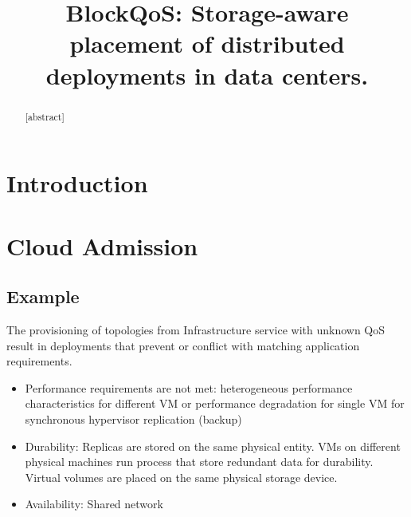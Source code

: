 \documentclass[conference]{IEEEtran}
\begin{document}
%
\title{BlockQoS: Storage-aware placement of distributed deployments in data centers.}


\author{
\and
{}
\and
{}
}


\maketitle

\begin{abstract}
[abstract]
\end{abstract}

\IEEEpeerreviewmaketitle

\section{Introduction}

\section{Cloud Admission}
\subsection{Example}

The provisioning of topologies from Infrastructure service with unknown QoS result in deployments that prevent or conflict with matching application requirements.
\begin{itemize}
	\item Performance requirements are not met: heterogeneous performance characteristics for different VM or performance degradation for single VM for synchronous hypervisor replication (backup)
	\item Durability: Replicas are stored on the same physical entity. VMs on different physical machines run process that store redundant data for durability. Virtual volumes are placed on the same physical storage device.
	\item Availability: Shared network
\end{itemize}
\end{document}
